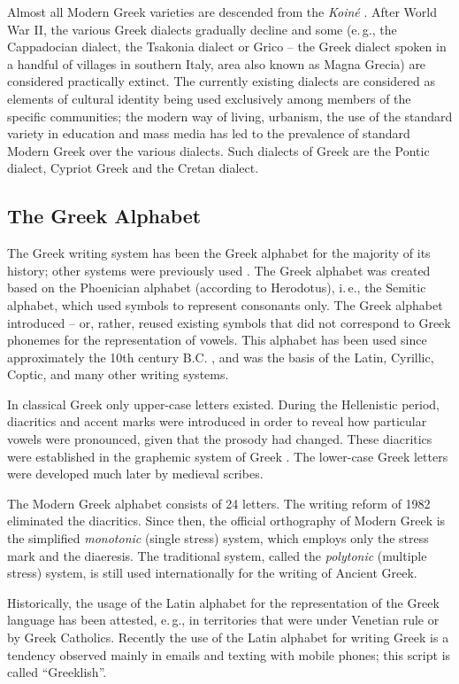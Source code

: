 \documentclass[]{../../metanetpaper}
\begin{document}
\begin{multicols}{2}
Almost all Modern Greek varieties are descended from the \textit{Koiné} \cite{Bro1}. After World War II, the various Greek dialects gradually decline and some (e.\,g., the Cappadocian dialect, the Tsakonia dialect or Grico -- the Greek dialect spoken in a handful of villages in southern Italy, area also known as Magna Grecia) are considered practically extinct. The currently existing dialects are considered as elements of cultural identity being used exclusively among members of the specific communities; the modern way of living, urbanism, the use of the standard variety in education and mass media has led to the prevalence of standard Modern Greek over the various dialects. Such dialects of Greek are the Pontic dialect, Cypriot Greek and the Cretan dialect.

\subsection{The Greek Alphabet}

The Greek writing system has been the Greek alphabet for the majority of its history; other systems were previously used \cite{Kopi1}. The Greek alphabet was created based on the Phoenician alphabet (according to Herodotus), i.\,e., the Semitic alphabet, which used symbols to represent consonants only. The Greek alphabet introduced – or, rather, reused existing symbols that did not correspond to Greek phonemes for the representation of vowels. This alphabet has been used since approximately the 10th century B.C. \cite{Tonn1}, and was the basis of the Latin, Cyrillic, Coptic, and many other writing systems.

In classical Greek only upper-case letters existed. During the Hellenistic period, diacritics and accent marks were introduced in order to reveal how particular vowels were pronounced, given that the prosody had changed. These diacritics were established in the graphemic system of Greek \cite{Chris1}. The lower-case Greek letters were developed much later by medieval scribes.

The Modern Greek alphabet consists of 24 letters. The writing reform of 1982 eliminated the diacritics. Since then, the official orthography of Modern Greek is the simplified \textit{monotonic} (single stress) system, which employs only the stress mark and the diaeresis. The traditional system, called the \textit{polytonic} (multiple stress) system, is still used internationally for the writing of Ancient Greek.

Historically, the usage of the Latin alphabet for the representation of the Greek language has been attested, e.\,g., in territories that were under Venetian rule or by Greek Catholics. Recently the use of the Latin alphabet for writing Greek is a tendency observed mainly in emails and texting with mobile phones; this script is called “Greeklish”.


\end{multicols}
\end{document}
